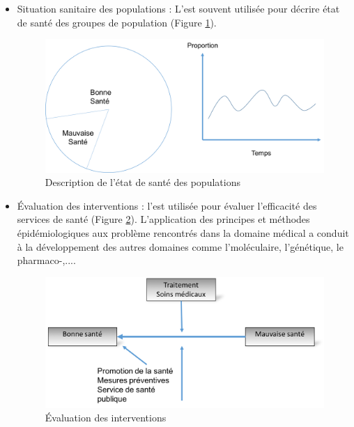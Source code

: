 \begin {itemize}
\item{Situation sanitaire des populations : L'\ep est souvent utilisée pour décrire état de santé des groupes de population (Figure \ref{Pic3}). 
\begin{figure}[h]
\includegraphics[width = \linewidth]{../figures/chap1/Pic3.png}
\caption{Description de l'état de santé des populations}
\label{Pic3}	
\end{figure}
}

\item{Évaluation des interventions : l'\ep est utilisée pour évaluer l'efficacité des services de santé (Figure \ref{Pic4}). L'application des principes et méthodes épidémiologiques aux problème rencontrés dans la domaine médical a conduit à la développement des autres domaines comme l'\ep moléculaire, l'\ep génétique, le pharmaco-\ep,.... 
\begin{figure}[h]
\includegraphics[width = \linewidth]{../figures/chap1/Pic4.png}
\caption{Évaluation des interventions}
\label{Pic4}	
\end{figure}
}
\end{itemize}

